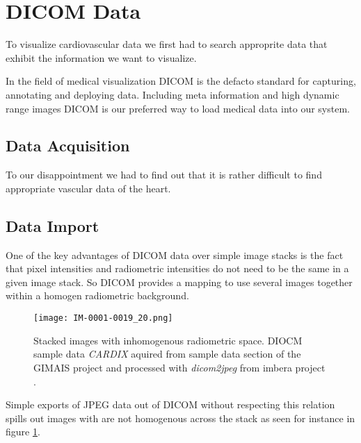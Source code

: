 \section{DICOM Data}

To visualize cardiovascular data we first had to search approprite data that exhibit the information we want to visualize.


In the field of medical visualization DICOM is the defacto standard for capturing, annotating and deploying data.
Including meta information and high dynamic range images DICOM is our preferred way to load medical data into our system.

\subsection{Data Acquisition}

To our disappointment we had to find out that it is rather difficult to find appropriate vascular data of the heart.


\subsection{Data Import}

One of the key advantages of DICOM data over simple image stacks is the fact that pixel intensities and radiometric intensities do not need to be the same in a given image stack. So DICOM provides a mapping to use several images together within a homogen radiometric background.


\begin{figure}[h]
	\centering
	\texttt{[image: IM-0001-0019\_20.png]} \\
	\caption{Stacked images with inhomogenous radiometric space. DIOCM sample data \emph{CARDIX} \cite{gimias_sampledata_2018} aquired from sample data section of the GIMAIS project \cite{gimias_2018} and processed with \emph{dicom2jpeg} from imbera project \cite{imebra_dicom_sdk_2018}.}
	\label{fig:IM-0001-0019_20}
\end{figure}

Simple exports of JPEG data out of DICOM without respecting this relation spills out images with are not homogenous across the stack as seen for instance in figure \ref{fig:IM-0001-0019_20}.



